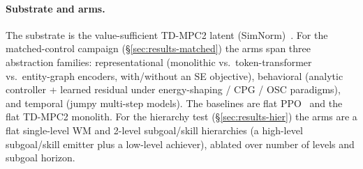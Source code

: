 \documentclass{article}
\begin{document}
\paragraph{Substrate and arms.}
The substrate is the value-sufficient TD-MPC2 latent (SimNorm)~\citep{hansen2024tdmpc2}.
For the matched-control campaign (\S\ref{sec:results-matched}) the arms span three
abstraction families: representational (monolithic vs.\ token-transformer vs.\
entity-graph encoders, with/without an SE objective), behavioral (analytic
controller + learned residual under energy-shaping / CPG / OSC paradigms), and
temporal (jumpy multi-step models). The baselines are flat PPO~\citep{schulman2017ppo}
and the flat TD-MPC2 monolith. For the hierarchy test (\S\ref{sec:results-hier})
the arms are a flat single-level WM and 2-level subgoal/skill hierarchies (a
high-level subgoal/skill emitter plus a low-level achiever), ablated over number
of levels and subgoal horizon.
\end{document}
